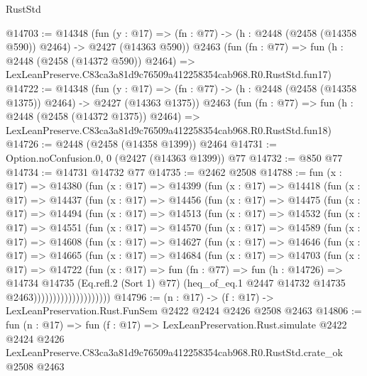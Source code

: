 \begin{lexlean}{RustStd}
\begin{coremodule}
@14703 := @14348
    (fun (y : @17) => (fn : @77) -> (h : @2448 (@2458 (@14358 @590)) @2464) -> @2427 (@14363 @590))
    @2463
    (fun (fn : @77) =>
    fun (h : @2448 (@2458 (@14372 @590)) @2464) =>
    LexLeanPreserve.C83ca3a81d9c76509a412258354cab968.R0.RustStd.fun17)
@14722 := @14348
    (fun (y : @17) =>
    (fn : @77) -> (h : @2448 (@2458 (@14358 @1375)) @2464) -> @2427 (@14363 @1375))
    @2463
    (fun (fn : @77) =>
    fun (h : @2448 (@2458 (@14372 @1375)) @2464) =>
    LexLeanPreserve.C83ca3a81d9c76509a412258354cab968.R0.RustStd.fun18)
@14726 := @2448 (@2458 (@14358 @1399)) @2464
@14731 := Option.noConfusion.{0, 0} (@2427 (@14363 @1399)) @77
@14732 := @850 @77
@14734 := @14731 @14732 @77
@14735 := @2462 @2508
@14788 := fun (x : @17) =>
  @14380
    (fun (x : @17) =>
    @14399
      (fun (x : @17) =>
      @14418
        (fun (x : @17) =>
        @14437
          (fun (x : @17) =>
          @14456
            (fun (x : @17) =>
            @14475
              (fun (x : @17) =>
              @14494
                (fun (x : @17) =>
                @14513
                  (fun (x : @17) =>
                  @14532
                    (fun (x : @17) =>
                    @14551
                      (fun (x : @17) =>
                      @14570
                        (fun (x : @17) =>
                        @14589
                          (fun (x : @17) =>
                          @14608
                            (fun (x : @17) =>
                            @14627
                              (fun (x : @17) =>
                              @14646
                                (fun (x : @17) =>
                                @14665
                                  (fun (x : @17) =>
                                  @14684
                                    (fun (x : @17) =>
                                    @14703
                                      (fun (x : @17) =>
                                      @14722
                                        (fun (x : @17) =>
                                        fun (fn : @77) =>
                                        fun (h : @14726) =>
                                        @14734
                                          @14735
                                          (Eq.refl.{2} (Sort 1) @77)
                                          (heq_of_eq.{1}
                                            @2447
                                            @14732
                                            @14735
                                            @2463))))))))))))))))))))
@14796 := (n : @17) -> (f : @17) -> LexLeanPreservation.Rust.FunSem @2422 @2424 @2426 @2508 @2463
@14806 := fun (n : @17) =>
  fun (f : @17) =>
  LexLeanPreservation.Rust.simulate
    @2422
    @2424
    @2426
    LexLeanPreserve.C83ca3a81d9c76509a412258354cab968.R0.RustStd.crate_ok
    @2508
    @2463
\end{coremodule}
\end{lexlean}
